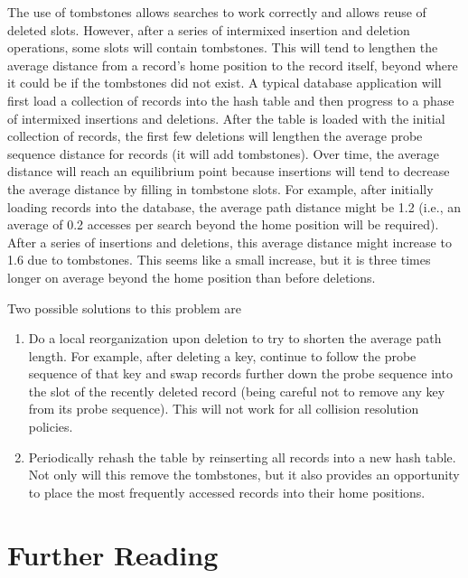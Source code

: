 The use of tombstones allows searches to work correctly and allows
reuse of deleted slots.
However, after a series of intermixed insertion and deletion
operations, some slots will contain tombstones.
This will tend to lengthen the average distance from a record's
home position to the record itself, beyond where it could be if the
tombstones did not exist.
A typical database application will first load a collection of records
into the hash table and then progress to a phase of intermixed
insertions and deletions.
After the table is loaded with the initial collection of
records, the first few deletions will lengthen the average
probe sequence distance for records (it
will add tombstones).
Over time, the average distance will reach an equilibrium point
because insertions will tend to decrease the average distance by
filling in tombstone slots.
For example, after initially loading records into the database, the
average path distance might be 1.2 (i.e., an average of 0.2 accesses
per search beyond the home position will be required).
After a series of insertions and deletions, this average distance
might increase to 1.6 due to tombstones.
This seems like a small increase, but it is three times longer on
average beyond the home position than before deletions.

Two possible solutions to this problem are

\begin{enumerate}

\item
Do a local reorganization upon deletion to try to shorten the average
path length.
For example, after deleting a key, continue to follow the
probe sequence of that key and swap
records further down the probe sequence
into the slot of the recently deleted record (being careful not to
remove any key from its probe sequence).
This will not work for all collision resolution policies.

\item
Periodically rehash the table by
reinserting all records into a new hash table.
Not only will this remove the tombstones, but it also provides an
opportunity to place the most frequently accessed records into their
home positions.

\end{enumerate}

\section{Further Reading}
\label{HashRead}

